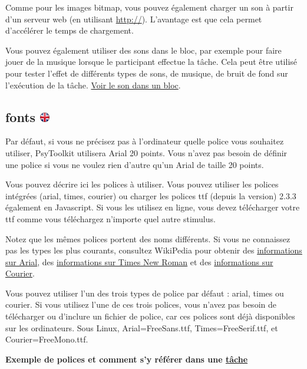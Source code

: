 \documentclass[
]{book}
\begin{document}
Comme pour les images bitmap, vous pouvez également charger un son à
partir d'un serveur web (en utilisant \url{http://}). L'avantage est que
cela permet d'accélérer le temps de chargement.

Vous pouvez également utiliser des sons dans le bloc, par exemple pour
faire jouer de la musique lorsque le participant effectue la tâche. Cela
peut être utilisé pour tester l'effet de différents types de sons, de
musique, de bruit de fond sur l'exécution de la tâche.
\protect\hyperlink{block-sound}{Voir le son dans un bloc}.

\hypertarget{fonts}{%
\subsection[fonts ]{\texorpdfstring{fonts
\href{https://www.psytoolkit.org/doc3.2.0/syntax.html\#fonts}{\protect\includegraphics{img/ukflag.png}}}{fonts }}\label{fonts}}

Par défaut, si vous ne précisez pas à l'ordinateur quelle police vous
souhaitez utiliser, PsyToolkit utilisera Arial 20 points. Vous n'avez
pas besoin de définir une police si vous ne voulez rien d'autre qu'un
Arial de taille 20 points.

Vous pouvez décrire ici les polices à utiliser. Vous pouvez utiliser les
polices intégrées (arial, times, courier) ou charger les polices ttf
(depuis la version) 2.3.3 également en Javascript. Si vous les utilisez
en ligne, vous devez télécharger votre ttf comme vous téléchargez
n'importe quel autre stimulus.

Notez que les mêmes polices portent des noms différents. Si vous ne
connaissez pas les types les plus courants, consultez WikiPedia pour
obtenir des \href{https://en.wikipedia.org/wiki/Arial}{informations sur
Arial}, des
\href{https://en.wikipedia.org/wiki/Times_New_Roman}{informations sur
Times New Roman} et des
\href{https://en.wikipedia.org/wiki/Courier_\%28typeface\%29}{informations
sur Courier}.

Vous pouvez utiliser l'un des trois types de police par défaut : arial,
times ou courier. Si vous utilisez l'une de ces trois polices, vous
n'avez pas besoin de télécharger ou d'inclure un fichier de police, car
ces polices sont déjà disponibles sur les ordinateurs. Sous Linux,
Arial=FreeSans.ttf, Times=FreeSerif.ttf, et Courier=FreeMono.ttf.

\textbf{Exemple de polices et comment s'y référer dans une
\protect\hyperlink{task}{tâche}}
\end{document}
